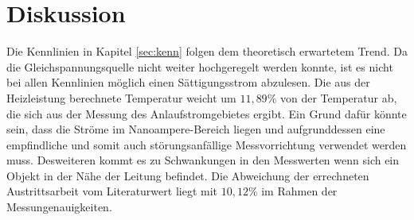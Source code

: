 \section{Diskussion}

Die Kennlinien in Kapitel \ref{sec:kenn} folgen dem theoretisch erwartetem Trend. Da die Gleichspannungsquelle nicht weiter hochgeregelt
werden konnte, ist es nicht bei allen Kennlinien möglich einen Sättigungsstrom abzulesen.
Die aus der Heizleistung berechnete Temperatur weicht um $11,89 \%$ von der Temperatur ab, die sich aus der Messung des Anlaufstromgebietes ergibt.
Ein Grund dafür könnte sein, dass die Ströme im Nanoampere-Bereich liegen und aufgrunddessen eine empfindliche und somit auch
störungsanfällige Messvorrichtung verwendet werden muss. Desweiteren kommt es zu Schwankungen in den Messwerten wenn sich ein Objekt in der
Nähe der Leitung befindet.
Die Abweichung der errechneten Austrittsarbeit vom Literaturwert liegt mit $10,12 \%$ im Rahmen der Messungenauigkeiten.
